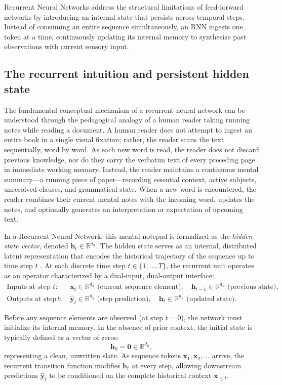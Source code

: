 \documentclass[../../../main.tex]{subfiles}
\begin{document}
Recurrent Neural Networks address the structural limitations of feed-forward networks by introducing an internal state that persists across temporal steps. Instead of consuming an entire sequence simultaneously, an RNN ingests one token at a time, continuously updating its internal memory to synthesize past observations with current sensory input.

\subsection{The recurrent intuition and persistent hidden state}
\label{subsec:rnn_intuition_hidden_state}

The fundamental conceptual mechanism of a recurrent neural network can be understood through the pedagogical analogy of a human reader taking running notes while reading a document. A human reader does not attempt to ingest an entire book in a single visual fixation; rather, the reader scans the text sequentially, word by word. As each new word is read, the reader does not discard previous knowledge, nor do they carry the verbatim text of every preceding page in immediate working memory. Instead, the reader maintains a continuous mental summary—a running piece of paper—recording essential context, active subjects, unresolved clauses, and grammatical state. When a new word is encountered, the reader combines their current mental notes with the incoming word, updates the notes, and optionally generates an interpretation or expectation of upcoming text.

In a Recurrent Neural Network, this mental notepad is formalized as the \textit{hidden state vector}, denoted $\mathbf{h}_t \in \mathbb{R}^{d_h}$. The hidden state serves as an internal, distributed latent representation that encodes the historical trajectory of the sequence up to time step $t$ \citep{elman1990}. At each discrete time step $t \in \{1, \dots, T\}$, the recurrent unit operates as an operator characterized by a dual-input, dual-output interface:
\begin{align}
\text{Inputs at step } t: & \quad \mathbf{x}_t \in \mathbb{R}^{d_x} \text{ (current sequence element)}, \quad \mathbf{h}_{t-1} \in \mathbb{R}^{d_h} \text{ (previous state)}, \\
\text{Outputs at step } t: & \quad \hat{\mathbf{y}}_t \in \mathbb{R}^{d_y} \text{ (step prediction)}, \quad \mathbf{h}_t \in \mathbb{R}^{d_h} \text{ (updated state)}.
\end{align}

Before any sequence elements are observed (at step $t = 0$), the network must initialize its internal memory. In the absence of prior context, the initial state is typically defined as a vector of zeros:
\begin{equation}
\mathbf{h}_0 = \mathbf{0} \in \mathbb{R}^{d_h},
\label{eq:rnn_zero_initialization}
\end{equation}
representing a clean, unwritten slate. As sequence tokens $\mathbf{x}_1, \mathbf{x}_2, \dots$ arrive, the recurrent transition function modifies $\mathbf{h}_t$ at every step, allowing downstream predictions $\hat{\mathbf{y}}_t$ to be conditioned on the complete historical context $\mathbf{x}_{\le t}$.
\end{document}
